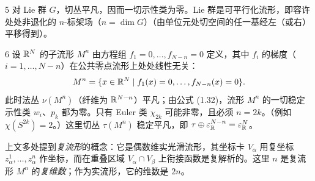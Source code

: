 \begin{example*}{5}
对 Lie 群 $G$，切丛平凡，因而一切示性类为零。Lie 群是可平行化流形，即容许处处非退化的 $n$-标架场（$n=\dim G$）（由单位元处切空间的任一基经左（或右）平移得到）。
\end{example*}

\begin{example}{6}
设 $\mathbb{R}^N$ 的子流形 $M^n$ 由方程组 $f_1=0,\ldots,f_{N-n}=0$ 定义，其中 $f_i$ 的梯度（$i=1,\ldots,N-n$）在公共零点流形上处处线性无关：
\[
M^n=\{x\in\mathbb{R}^N\mid f_1(x)=0,\ldots,f_{N-n}(x)=0\}.
\]
此时法丛 $\nu(M^n)$（纤维为 $\mathbb{R}^{N-n}$）平凡；由公式 (1.32)，流形 $M^n$ 的一切稳定示性类 $w_i$、$p_k$ 都为零。只有 Euler 类 $\chi_{2k}$ 可能非零，且必须 $n=2k$。（例如 $\chi(S^{2k})=2$。）这里切丛 $\tau(M^n)$ 稳定平凡，即 $\tau\oplus\varepsilon_{\mathbb{R}}^{N-n}=\varepsilon_{\mathbb{R}}^N$。
\end{example}

上文多处提到\emph{复流形}的概念：它是偶数维实光滑流形，其坐标卡 $V_\alpha$ 用复坐标 $z_\alpha^1,\ldots,z_\alpha^n$ 作坐标，而在重叠区域 $V_\alpha\cap V_\beta$ 上衔接函数是复解析的。这里 $n$ 是复流形 $M^n$ 的\emph{复维数}；作为实流形，它的维数是 $2n$。

